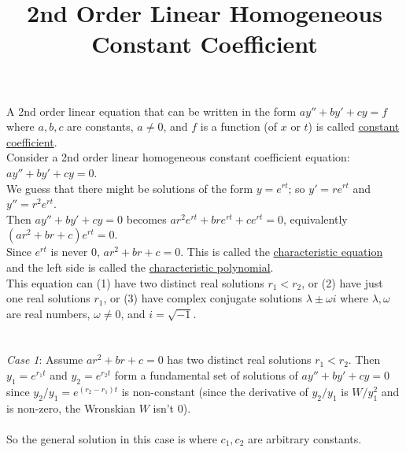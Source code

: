 \documentclass{ximera}
\begin{document}
\begin{abstract}
 \end{abstract}

    \title{2nd Order Linear Homogeneous Constant Coefficient}
    
    \maketitle

 A 2nd order linear equation that can be written in the form $ay''+by'+cy=f$ where $a,b,c$ are constants, $a\neq 0$, and $f$ is a function (of $x$ or $t$) is called \underline{constant coefficient}.  \\

 Consider a 2nd order linear homogeneous constant coefficient equation:  $ay''+by'+cy=0$.\\

 We guess that there might be solutions of the form $y=e^{rt}$; so $y'=re^{rt}$ and $y''=r^2 e^{rt}$.\\

 Then $ay''+by'+cy=0$ becomes $ar^2 e^{rt}+br e^{rt}+c e^{rt}=0$, equivalently $\left(ar^2+br +c\right) e^{rt}=0$.\\

 Since $e^{rt}$ is never $0$, $ar^2+br +c=0$.  This is called the \underline{characteristic equation} and the left side is called the \underline{characteristic polynomial}.  \\

 This equation can (1) have two distinct real solutions $r_1<r_2$, or (2) have just one real solutions $r_1$, or (3) have complex conjugate solutions $\lambda \pm \omega i$ where $\lambda,\omega$ are real numbers, $\omega\neq 0$, and $i=\sqrt{-1}$.\\ \\ \\

\emph{Case 1}:  Assume $ar^2+br +c=0$ has two distinct real solutions $r_1<r_2$. Then $y_1=e^{r_1 t}$ and $y_2=e^{r_2 t}$ form a fundamental set of solutions of $ay''+by'+cy=0$ since $y_2/y_1=e^{(r_2-r_1)t}$ is non-constant (since the derivative of $y_2/y_1$ is $W/y_1^2$ and is non-zero, the Wronskian $W$ isn't $0$).\\ \\

 So the general solution in this case is  where $c_1,c_2$ are arbitrary constants.
\end{document}
